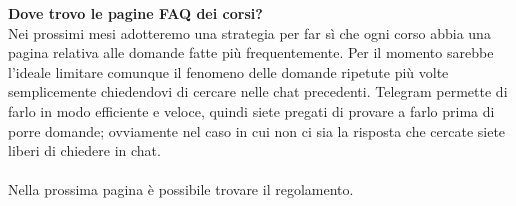 \documentclass[a4paper, 11pt, oneside, article]{book} %
\begin{document}
\textbf{Dove trovo le pagine FAQ dei corsi?}\\

Nei prossimi mesi adotteremo una strategia per far sì che ogni corso abbia una pagina relativa alle domande fatte più frequentemente.
Per il momento sarebbe l'ideale limitare comunque il fenomeno delle domande ripetute più volte semplicemente chiedendovi di cercare nelle chat precedenti.
Telegram permette di farlo in modo efficiente e veloce, quindi siete pregati di provare a farlo prima di porre domande; ovviamente nel caso in cui non ci sia la risposta che cercate siete liberi di chiedere in chat.\\\\
Nella prossima pagina è possibile trovare il regolamento.

\newpage
\end{document}
